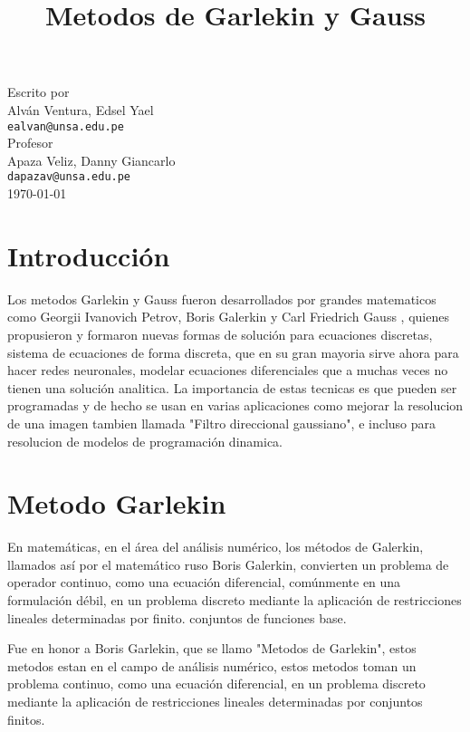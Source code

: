 \documentclass[a4paper,12pt]{article}
\begin{document}
\title{Metodos de Garlekin y Gauss}
\date{\vspace{-5ex}}
\maketitle
\begin{center}
Escrito por\\
Alván Ventura, Edsel Yael\\ \texttt{ealvan@unsa.edu.pe}
\\[3mm]
Profesor\\Apaza Veliz, Danny Giancarlo\\ \texttt{dapazav@unsa.edu.pe}\\[3mm]
\today
\end{center}
\section{Introducción}
    Los metodos Garlekin y Gauss fueron desarrollados 
    por grandes matematicos como Georgii Ivanovich Petrov, Boris Galerkin y  Carl Friedrich Gauss 
    , quienes propusieron y formaron nuevas formas de solución para ecuaciones discretas,
    sistema de ecuaciones de forma discreta, que en su gran mayoria sirve ahora para
    hacer redes neuronales\cite{5}, modelar ecuaciones diferenciales que a muchas veces
    no tienen una solución analitica. La importancia de estas tecnicas es 
    que pueden ser programadas y de hecho se usan en varias aplicaciones como
    mejorar la resolucion de una imagen tambien llamada "Filtro direccional gaussiano"\cite{1},
    e incluso para resolucion de modelos de programación dinamica.

\section{Metodo Garlekin}
En matemáticas, en el área del análisis numérico, 
los métodos de Galerkin, llamados así por el matemático 
ruso Boris Galerkin, convierten un problema de operador 
continuo, como una ecuación diferencial, comúnmente en 
una formulación débil, en un problema discreto mediante 
la aplicación de restricciones lineales determinadas por 
finito. conjuntos de funciones base.

Fue en honor a Boris Garlekin, que se llamo "Metodos de Garlekin",
estos metodos estan en el campo de análisis numérico, estos metodos toman
un problema continuo, como una ecuación diferencial, en un problema 
discreto mediante la aplicación de restricciones lineales determinadas
por conjuntos finitos.
\end{document}

